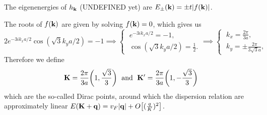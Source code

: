 \documentclass[a4paper,10pt]{article}
\begin{document}
The eigenenergies of $h_{\vb{k}}$ (UNDEFINED yet) are $E_\pm(\vb{k}) = \pm t \abs{f(\vb{k})}$.

The roots of $f(\vb{k})$ are given by solving $f(\vb{k}) = 0$, which gives us
$$
2 e^{-3ik_x a / 2} \cos(\sqrt{3} k_y a / 2) = -1 \implies
\begin{cases}
\; e^{-3i k_x a/2} = - 1, \\
\; \cos(\sqrt{3} k_y a / 2) = \frac{1}{2}.
\end{cases}
\implies
\begin{cases}
\; k_x = \frac{2\pi}{3a}, \\
\; k_y = \pm \frac{2\pi}{3 \sqrt{3} a},
\end{cases}
$$
Therefore we define
$$
\vb{K} = \frac{2\pi}{3a} \qty(1, \frac{\sqrt{3}}{3}) \; \text{ and } \;
\vb{K}' = \frac{2\pi}{3a} \qty(1, -\frac{\sqrt{3}}{3})
$$
which are the so-called Dirac points, around which the dispersion relation are approximately linear $E(\vb{K} + \vb{q}) = v_F \abs{\vb{q}} + O\qty[(\frac{q}{K})^2]$.

%


\end{document}
